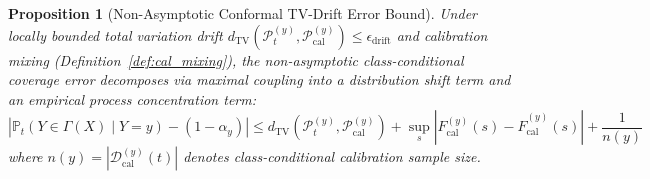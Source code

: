\documentclass[journal,twoside]{IEEEtran}
\newtheorem{proposition}{Proposition}
\begin{document}
\begin{proposition}[Non-Asymptotic Conformal TV-Drift Error Bound]
\label{prop:conformal_tv_bound}
Under locally bounded total variation drift $d_{\mathrm{TV}}(\mathcal{P}_t^{(y)}, \mathcal{P}_{\text{cal}}^{(y)}) \le \epsilon_{\text{drift}}$ and calibration mixing (Definition~\ref{def:cal_mixing}), the non-asymptotic class-conditional coverage error decomposes via maximal coupling into a distribution shift term and an empirical process concentration term:
\begin{equation}
\left| \mathbb{P}_{t}\left(Y \in \Gamma(X) \mid Y=y\right) - (1 - \alpha_y) \right| \le d_{\mathrm{TV}}(\mathcal{P}_t^{(y)}, \mathcal{P}_{\text{cal}}^{(y)}) + \sup_{s} \left| F_{\text{cal}}^{(y)}(s) - \hat{F}_{\text{cal}}^{(y)}(s) \right| + \frac{1}{n(y)}
\end{equation}
where $n(y) = |\mathcal{D}_{\text{cal}}^{(y)}(t)|$ denotes class-conditional calibration sample size.
\end{proposition}
\end{document}
